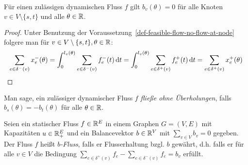 \begin{lemma}\label{lemma-balance-0}
	Für einen zulässigen dynamischen Fluss $f$ gilt $b_v(\theta)=0$ für alle Knoten $v\in V\setminus\{ s,t \}$ und alle $\theta\in\mathbb{R}$.
\end{lemma}
\begin{proof}
	Unter Benutzung der Voraussetzung~\ref{def-feasible-flow-no-flow-at-node} folgere man für $v\in V\setminus \{ s, t\}, \theta\in\mathbb{R}$:
	$$\sum_{e\in\delta^-(v)} x_e^-(\theta) = \int_{0}^{l_v(\theta)} \sum_{e\in\delta^-(v)} f_e^-(t) \mathop{}\!\mathrm{d} t = \int_{0}^{l_v(\theta)} \sum_{e\in\delta^+(v)} f_e^+(t) \mathop{}\!\mathrm{d} t = \sum_{e\in\delta^+(v)}x_e^+(\theta)$$
\end{proof}

\begin{definition}
	Man sage, ein zulässiger dynamischer Fluss $f$ \emph{fließe ohne Überholungen}, falls $b_s(\theta) = -b_t(\theta)$ für alle $\theta\in\mathbb{R}$.
\end{definition}


\begin{definition}
	Seien ein statischer Fluss $f \in \mathbb{R}^E$ in einem Graphen $G=(V,E)$ mit Kapazitäten $u\in \mathbb{R}_+^E$ und ein Balancevektor $b\in\mathbb{R}^V$ mit $\sum_{v\in V} b_v = 0$ gegeben.
	Der Fluss $f$ heißt \emph{$b$-Fluss}, falls er Flusserhaltung bzgl. $b$ gewährt, d.h. falls er für alle $v\in V$ die Bedingung $\sum_{e\in\delta^+(v)}f_e - \sum_{e\in\delta^-(v)}f_e = b_v$ erfüllt.
\end{definition}


